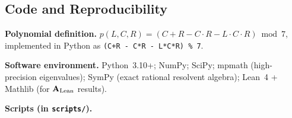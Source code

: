 \documentclass[11pt]{article}
\theoremstyle{remark}
\newcommand{\CatAL}{\ensuremath{\textbf{A}_{\rm Lean}}}
\begin{document}
\begin{appendices}

\section{Code and Reproducibility}
\label{app:code}

\noindent\textbf{Polynomial definition.}
$p(L,C,R) = (C + R - C \cdot R - L \cdot C \cdot R) \bmod 7$,
implemented in Python as \texttt{(C+R - C*R - L*C*R) \% 7}.

\noindent\textbf{Software environment.}
Python~3.10+; NumPy; SciPy; mpmath (high-precision eigenvalues); SymPy
(exact rational resolvent algebra); Lean~4 + Mathlib (for \CatAL{} results).

\noindent\textbf{Scripts (in \texttt{scripts/}).}


\end{appendices}
\end{document}
